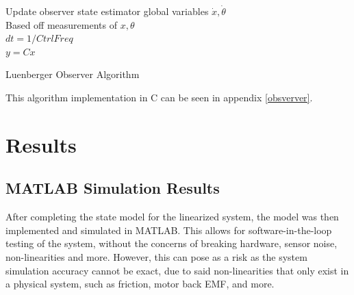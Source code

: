 \documentclass[12pt]{article}
\begin{document}
\footnotesize
\begin{algorithm}[H]
    \SetAlgoLined
    Update observer state estimator global variables $\dot{x},\dot{\theta}$\\
    Based off measurements of $x,\theta$\\
    \bigskip
    $dt = 1/CtrlFreq$\\
    $y = Cx$\\
    \caption{Luenberger Observer Algorithm}
\end{algorithm}
\normalsize
This algorithm implementation in C can be seen in appendix \ref{obsverver}.

\section{Results}
\subsection{MATLAB Simulation Results}
After completing the state model for the linearized system, the model was then implemented and simulated in MATLAB. This allows for software-in-the-loop testing of the system, without the concerns of breaking hardware, sensor noise, non-linearities and more. However, this can pose as a risk as the system simulation accuracy cannot be exact, due to said non-linearities that only exist in a physical system, such as friction, motor back EMF, and more. 
\end{document}
